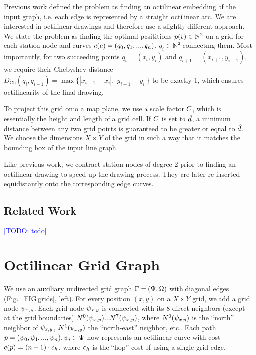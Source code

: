 \documentclass[sigconf]{acmart}
\newcommand\TODO[1]{\textcolor{blue}{\small [TODO: #1]}}
\begin{document}
%
Previous work defined the problem as finding an octilinear embedding of the input graph, i.e. each edge is represented by a straight octilinear arc.
We are interested in octilinear drawings and therefore use a slightly different approach.
We state the problem as finding the optimal posititions $p(v) \in \mathbb{N}^2$ on a grid for each station node and curves $c(e) = (q_0, q_1, ..., q_n)$, $q_i \in \mathbb{N}^2$ connecting them. 
Most importantly, for two succeeding points $q_i = (x_i, y_i)$ and $q_{i+1} = (x_{i+1}, y_{i+1})$, we require their Chebyshev distance $D_\text{Ch}(q_i, q_{i+1}) = \max \{|x_{i+1} - x_i|, |y_{i+1} - y_i|\}$ to be exactly 1, which ensures octilinearity of the final drawing.

To project this grid onto a map plane, we use a scale factor $C$, which is essentially the height and length of a grid cell.
If $C$ is set to $\hat d$, a minimum distance between any two grid points is guaranteed to be greater or equal to $\hat d$.
We choose the dimensions $X\times Y$ of the grid in such a way that it matches the bounding box of the input line graph.

Like previous work, we contract station nodes of degree 2 prior to finding an octilinear drawing to speed up the drawing process.
They are later re-inserted equidistantly onto the corresponding edge curves.

\subsection{Related Work}

\TODO{todo}

\section{Octilinear Grid Graph}

We use an auxiliary undirected grid graph $\Gamma = (\Psi, \Omega)$ with diagonal edges (Fig.~\ref{FIG:grids}, left).
For every position $(x, y)$ on a $X\times Y$ grid, we add a grid node $\psi_{x, y}$.
Each grid node $\psi_{x, y}$ is connected with its 8 direct neighbors (except at the grid boundaries) $N^0(\psi_{x, y}) ... N^7(\psi_{x, y})$, where $N^0(\psi_{x, y})$ is the ``north'' neighbor of $\psi_{x, y}$, $N^1(\psi_{x, y})$ the ``north-east'' neighbor, etc..
Each path $p = (\psi_0, \psi_1, ..., \psi_n), \psi_i \in \Psi$ now represents an octilinear curve with cost $c(p) = (n - 1) \cdot c_h$, where $c_h$ is the ``hop'' cost of using a single grid edge.
\end{document}

